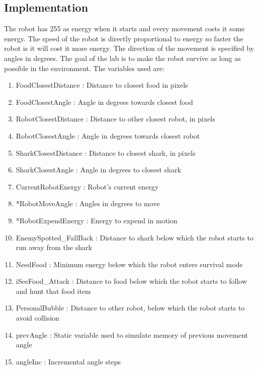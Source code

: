 \documentclass[12pt]{article}
\begin{document}
\subsection{Implementation}
The robot has 255 as energy when it starts and every movement costs it some energy. The speed of the robot is directly proportional to energy so faster the robot is it will cost it more energy. The direction of the movement is specified by angles in degrees. The goal of the lab is to make the robot survive as long as possible in the environment. The variables used are:
\begin{enumerate}
	\item FoodClosestDistance : Distance to closest food in pixels
	\item FoodClosestAngle : Angle in degrees towards closest food
	\item RobotClosestDistance : Distance to other closest robot, in pixels
	\item RobotClosestAngle :  Angle in degrees towards closest robot
	\item SharkClosestDistance : Distance to closest shark, in pixels
	\item SharkClosestAngle : Angle in degrees to closest shark
	\item CurrentRobotEnergy : Robot's current energy
	\item *RobotMoveAngle : Angles in degrees to move
	\item *RobotExpendEnergy : Energy to expend in motion
	\item EnemySpotted\_FallBack : Distance to shark below which the robot starts to run away from the shark
	\item NeedFood : Minimum energy below which the robot enters survival mode
	\item iSeeFood\_Attack : Distance to food below which the robot starts to follow and hunt that food item
	\item PersonalBubble : Distance to other robot, below which the robot starts to avoid collision
	\item prevAngle : Static variable used to simulate memory of previous movement angle
	\item angleInc : Incremental angle steps
\end{enumerate}
\end{document}
